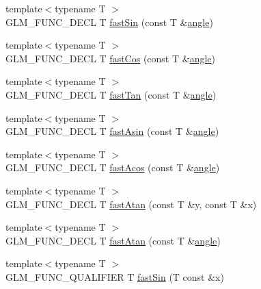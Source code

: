 \begin{DoxyCompactItemize}
\item 
{\footnotesize template$<$typename T $>$ }\\G\-L\-M\-\_\-\-F\-U\-N\-C\-\_\-\-D\-E\-C\-L T \hyperlink{group__gtx__fast__trigonometry_ga01b7dc431bf5f5e6acce7d6bba311f86}{fast\-Sin} (const T \&\hyperlink{group__gtc__quaternion_ga23a3fc7ada5bbb665ff84c92c6e0542c}{angle})
\item 
{\footnotesize template$<$typename T $>$ }\\G\-L\-M\-\_\-\-F\-U\-N\-C\-\_\-\-D\-E\-C\-L T \hyperlink{group__gtx__fast__trigonometry_gad54184beaba79e41db71a1f5711380c4}{fast\-Cos} (const T \&\hyperlink{group__gtc__quaternion_ga23a3fc7ada5bbb665ff84c92c6e0542c}{angle})
\item 
{\footnotesize template$<$typename T $>$ }\\G\-L\-M\-\_\-\-F\-U\-N\-C\-\_\-\-D\-E\-C\-L T \hyperlink{group__gtx__fast__trigonometry_gae6615cdb40d8dc58115a07a21f495561}{fast\-Tan} (const T \&\hyperlink{group__gtc__quaternion_ga23a3fc7ada5bbb665ff84c92c6e0542c}{angle})
\item 
{\footnotesize template$<$typename T $>$ }\\G\-L\-M\-\_\-\-F\-U\-N\-C\-\_\-\-D\-E\-C\-L T \hyperlink{group__gtx__fast__trigonometry_gab8595a77c5b215b95f662238dc3ff722}{fast\-Asin} (const T \&\hyperlink{group__gtc__quaternion_ga23a3fc7ada5bbb665ff84c92c6e0542c}{angle})
\item 
{\footnotesize template$<$typename T $>$ }\\G\-L\-M\-\_\-\-F\-U\-N\-C\-\_\-\-D\-E\-C\-L T \hyperlink{group__gtx__fast__trigonometry_ga44e6efc3e776a51645fdf998e3e4f11b}{fast\-Acos} (const T \&\hyperlink{group__gtc__quaternion_ga23a3fc7ada5bbb665ff84c92c6e0542c}{angle})
\item 
{\footnotesize template$<$typename T $>$ }\\G\-L\-M\-\_\-\-F\-U\-N\-C\-\_\-\-D\-E\-C\-L T \hyperlink{group__gtx__fast__trigonometry_gaf6234384b94846e29cf2c51dc245d484}{fast\-Atan} (const T \&y, const T \&x)
\item 
{\footnotesize template$<$typename T $>$ }\\G\-L\-M\-\_\-\-F\-U\-N\-C\-\_\-\-D\-E\-C\-L T \hyperlink{group__gtx__fast__trigonometry_ga49b3b2b777b83eeed3e11205e800027e}{fast\-Atan} (const T \&\hyperlink{group__gtc__quaternion_ga23a3fc7ada5bbb665ff84c92c6e0542c}{angle})
\item 
{\footnotesize template$<$typename T $>$ }\\G\-L\-M\-\_\-\-F\-U\-N\-C\-\_\-\-Q\-U\-A\-L\-I\-F\-I\-E\-R T \hyperlink{group__gtx__fast__trigonometry_ga01b7dc431bf5f5e6acce7d6bba311f86}{fast\-Sin} (T const \&x)

\end{DoxyCompactItemize}
